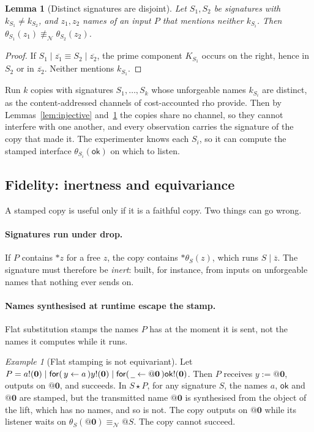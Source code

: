 \documentclass[11pt]{article}
\makeatletter
\theoremstyle{definition}
\theoremstyle{plain}
\newtheorem{lemma}[definition]{Lemma}
\theoremstyle{remark}
\newtheorem{example}[definition]{Example}
\newcommand{\quo}[1]{@#1}
\newcommand{\drp}[1]{{*}#1}
\newcommand{\dr}[1]{\overline{#1}}
\newcommand{\inp}[3]{\mathsf{for}(\,#1 \leftarrow #2\,)#3}
\newcommand{\out}[2]{#1!(#2)}
\newcommand{\nequiv}{\equiv_{\mathcal{N}}}
\newcommand{\nil}{\mathbf{0}}
\newcommand{\wild}{\mathord{\underline{\hspace{0.5em}}}}
\newcommand{\ok}{\mathsf{ok}}
\newcommand{\act}{\mathbin{\star}}
\makeatother
\begin{document}
\begin{lemma}[Distinct signatures are disjoint]\label{lem:disjoint}
Let $S_1, S_2$ be signatures with $k_{S_1} \neq k_{S_2}$, and $z_1, z_2$
names of an input $P$ that mentions neither $k_{S_i}$. Then
$\theta_{S_1}(z_1) \not\nequiv \theta_{S_2}(z_2)$.
\end{lemma}

\begin{proof}
If $S_1 \mid \dr{z_1} \equiv S_2 \mid \dr{z_2}$, the prime component
$K_{S_1}$ occurs on the right, hence in $S_2$ or in $\dr{z_2}$. Neither
mentions $k_{S_1}$.
\end{proof}

Run $k$ copies with signatures $S_1, \dots, S_k$ whose unforgeable names
$k_{S_i}$ are distinct, as the content-addressed channels of
cost-accounted rho provide. Then by Lemmas~\ref{lem:injective}
and~\ref{lem:disjoint} the copies share no channel, so they cannot
interfere with one another, and every observation carries the signature
of the copy that made it. The experimenter knows each $S_i$, so it can
compute the stamped interface $\theta_{S_i}(\ok)$ on which to listen.

\subsection{Fidelity: inertness and equivariance}

A stamped copy is useful only if it is a faithful copy. Two things can go
wrong.

\paragraph{Signatures run under drop.} If $P$ contains $\drp{z}$ for a
free $z$, the copy contains $\drp{\theta_S(z)}$, which runs $S \mid
\dr{z}$. The signature must therefore be \emph{inert}: built, for
instance, from inputs on unforgeable names that nothing ever sends on.

\paragraph{Names synthesised at runtime escape the stamp.} Flat
substitution stamps the names $P$ has at the moment it is sent, not the
names it computes while it runs.

\begin{example}[Flat stamping is not equivariant]\label{ex:nonequivariant}
Let $P = \out{a}{\nil} \mid \inp{y}{a}{\out{y}{\nil}} \mid
\inp{\wild}{\quo{\nil}}{\out{\ok}{\nil}}$. Then $P$ receives $y :=
\quo{\nil}$, outputs on $\quo{\nil}$, and succeeds. In $S \act P$, for any
signature $S$, the names $a$, $\ok$ and $\quo{\nil}$ are stamped, but
the transmitted name $\quo{\nil}$ is synthesised from the object of the
lift, which has no names, and so is not. The copy outputs on $\quo{\nil}$
while its listener waits on $\theta_S(\quo{\nil}) \nequiv \quo{S}$. The
copy cannot succeed.
\end{example}
\end{document}
